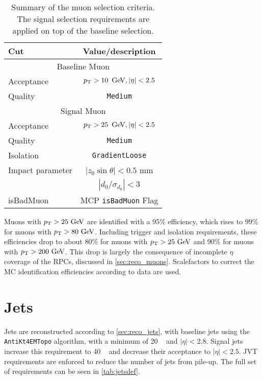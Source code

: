 \begin{table}[ph!]
  \begin{center}
    \begin{tabular}{l|c}
      \hline
      Cut            & Value/description \\
      \hline
      \hline
      \multicolumn{2}{c}{Baseline Muon}\\
      \hline
      Acceptance     & $\pt > 10\,\GeV, |\eta| < 2.5$ \\
      Quality        & \texttt{Medium}    \\
      \hline
      \multicolumn{2}{c}{Signal Muon}\\
      \hline
      Acceptance     & $\pt > 25\,\GeV, |\eta| < 2.5$ \\
      Quality        & \texttt{Medium}    \\
      Isolation        & \texttt{GradientLoose} \\
      Impact parameter & $|z_0 \sin\theta|< 0.5$ mm \\
                       & $|d_0/\sigma_{d_0}|< 3$ \\ 
      isBadMuon        & MCP \texttt{isBadMuon} Flag  \\
      \hline		  
      \hline
    \end{tabular}
  \caption{Summary of the muon selection criteria. The signal selection requirements are applied on top of the baseline selection.}            
    \label{tab:muondef}
  \end{center}
\end{table}

Muons with $\pt>25\gev$ are identified with a 95\% efficiency, which rises to 99\% for muons with $\pt>80\gev$\cite{PERF-2015-10}. Including trigger and isolation requirements, these efficiencies drop to about 80\% for muons with $\pt>25\gev$ and 90\% for muons with $\pt>200\gev$. This drop is largely the consequence of incomplete $\eta$ coverage of the \acp{RPC}, discussed in \autoref{sec:reco_muons}. Scalefactors to correct the \ac{MC} identification efficiencies according to data are used.

\section{Jets}

Jets are reconstructed according to \autoref{sec:reco_jets}, with baseline jets using the \texttt{AntiKt4EMTopo} algorithm, with a minimum \pt of 20 \gev~ and $|\eta|<2.8$. Signal jets increase this \pt requirement to 40 \gev~ and decrease their acceptance to $|\eta|<2.5$. \ac{JVT} requirements are enforced to reduce the number of jets from pile-up. The full set of requirements can be seen in \autoref{tab:jetsdef}.

